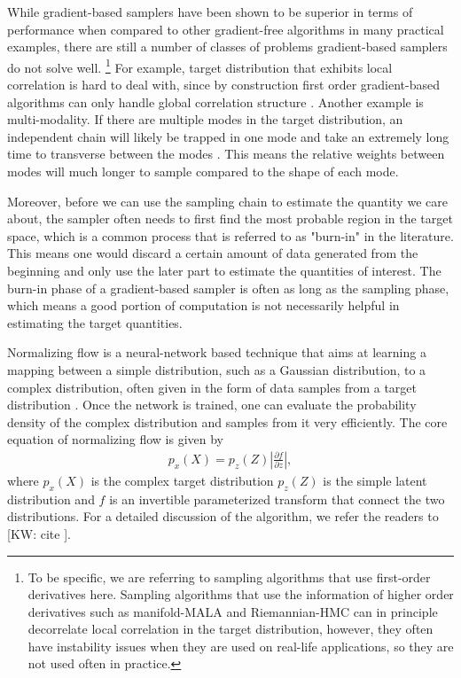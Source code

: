 \documentclass[twocolumn]{aastex631}
\newcommand{\kw}[1]{{\color{rb4}[KW: #1 ]}}
\begin{document}
While gradient-based samplers have been shown to be superior in terms of
performance when compared to other gradient-free algorithms in many practical
examples, there are still a number of classes of problems gradient-based
samplers do not solve well. \footnote{To be specific, we are referring to
sampling algorithms that use first-order derivatives here. Sampling algorithms
that use the information of higher order derivatives such as manifold-MALA and
Riemannian-HMC \cite{RMHMC} can in principle decorrelate local correlation in
the target distribution, however, they often have instability issues when they
are used on real-life applications, so they are not used often in practice.} For
example, target distribution that exhibits local correlation is hard to deal
with, since by construction first order gradient-based algorithms can only
handle global correlation structure \cite{2017arXiv170102434B}. Another example
is multi-modality. If there are multiple modes in the target distribution, an
independent chain will likely be trapped in one mode and take an extremely long
time to transverse between the modes \cite{2018arXiv180803230M}. This means the
relative weights between modes will much longer to sample compared to the shape
of each mode.

Moreover, before we can use the sampling chain to estimate the quantity we care about,
the sampler often needs to first find the most probable region in the target
space, which is a common process that is referred to as "burn-in" in the
literature. This means one would discard a certain amount of data generated from
the beginning and only use the later part to estimate the quantities of
interest. The burn-in phase of a gradient-based sampler is often as long as the
sampling phase, which means a good portion of computation is not necessarily
helpful in estimating the target quantities.

Normalizing flow is a neural-network based technique that aims at learning a
mapping between a simple distribution, such as a Gaussian distribution, to a
complex distribution, often given in the form of data samples from a target
distribution \cite{2019arXiv190809257K, 2019arXiv191202762P}. Once the network is trained, one can evaluate the probability
density of the complex distribution and samples from it very efficiently.
The core equation of normalizing flow is given by
\begin{align}
    p_x(X) = p_z(Z) \left| \frac{\partial f}{\partial z}\right|,
\end{align}
where $p_x(X)$ is the complex target distribution $p_z(Z)$ is the simple latent
distribution and $f$ is an invertible parameterized transform that
connect the two distributions. For a detailed discussion of the algorithm, we
refer the readers to \kw{cite}.
\end{document}
